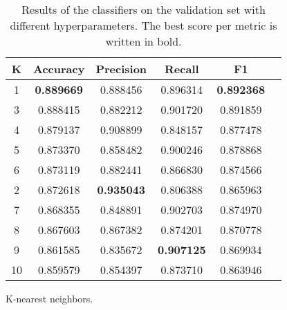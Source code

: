 \begin{appendices}
\begin{table}[ht]
\bigskip
\begin{subtable}{\textwidth}
\begin{adjustbox}{minipage=18cm, center}
\centering
\begin{tabular*}{\textwidth}{c @{\extracolsep{\fill}} ccccc}
\toprule
K &  Accuracy &  Precision &    Recall &        F1 \\
\midrule
1  &  \textbf{0.889669} &   0.888456 &  0.896314 &  \textbf{0.892368} \\
3  &  0.888415 &   0.882212 &  0.901720 &  0.891859 \\
4  &  0.879137 &   0.908899 &  0.848157 &  0.877478 \\
5  &  0.873370 &   0.858482 &  0.900246 &  0.878868 \\
6  &  0.873119 &   0.882441 &  0.866830 &  0.874566 \\
2  &  0.872618 &   \textbf{0.935043} &  0.806388 &  0.865963 \\
7  &  0.868355 &   0.848891 &  0.902703 &  0.874970 \\
8  &  0.867603 &   0.867382 &  0.874201 &  0.870778 \\
9  &  0.861585 &   0.835672 &  \textbf{0.907125} &  0.869934 \\
10 &  0.859579 &   0.854397 &  0.873710 &  0.863946 \\
\bottomrule
\end{tabular*}
\caption{K-nearest neighbors.}\label{tab:sub_first}

\end{adjustbox}
\end{subtable}

\caption{Results of the classifiers on the validation set with different hyperparameters. The best score per metric is written in bold.} \label{tab:Hyperparameters}
\end{table}

\end{appendices}






